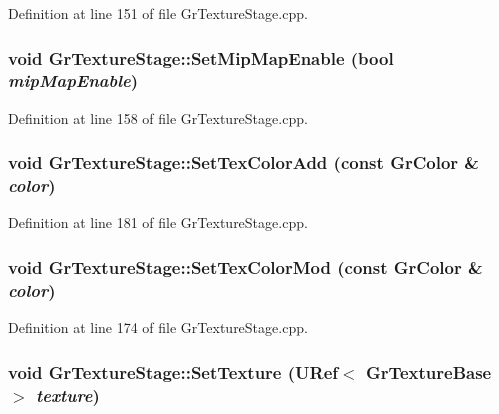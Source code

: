 \begin{CompactItemize}
Definition at line 151 of file GrTextureStage.cpp.\hypertarget{class_gr_texture_stage_ed9af9744e9097a1745e1c9efda29141}{
\subsubsection[{SetMipMapEnable}]{\setlength{\rightskip}{0pt plus 5cm}void GrTextureStage::SetMipMapEnable (bool {\em mipMapEnable})}}
\label{class_gr_texture_stage_ed9af9744e9097a1745e1c9efda29141}




Definition at line 158 of file GrTextureStage.cpp.\hypertarget{class_gr_texture_stage_6dc007a985aac8227b9e445829d42756}{
\subsubsection[{SetTexColorAdd}]{\setlength{\rightskip}{0pt plus 5cm}void GrTextureStage::SetTexColorAdd (const {\bf GrColor} \& {\em color})}}
\label{class_gr_texture_stage_6dc007a985aac8227b9e445829d42756}




Definition at line 181 of file GrTextureStage.cpp.\hypertarget{class_gr_texture_stage_1803888bbf5d820f060465bd63bf88bd}{
\subsubsection[{SetTexColorMod}]{\setlength{\rightskip}{0pt plus 5cm}void GrTextureStage::SetTexColorMod (const {\bf GrColor} \& {\em color})}}
\label{class_gr_texture_stage_1803888bbf5d820f060465bd63bf88bd}




Definition at line 174 of file GrTextureStage.cpp.\hypertarget{class_gr_texture_stage_d1c9b29aa390259ccc36d6f518502801}{
\subsubsection[{SetTexture}]{\setlength{\rightskip}{0pt plus 5cm}void GrTextureStage::SetTexture ({\bf URef}$<$ {\bf GrTextureBase} $>$ {\em texture})}}
\label{class_gr_texture_stage_d1c9b29aa390259ccc36d6f518502801}





\end{CompactItemize}
